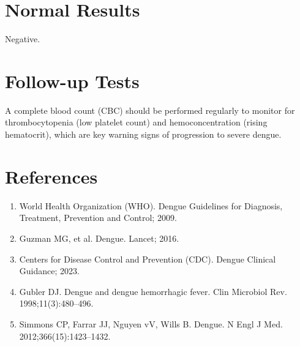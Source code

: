 \section*{Normal Results}
Negative.

\section*{Follow-up Tests}
A complete blood count (CBC) should be performed regularly to monitor for thrombocytopenia (low platelet count) and hemoconcentration (rising hematocrit), which are key warning signs of progression to severe dengue.

\section*{References}
\begin{enumerate}
  \item World Health Organization (WHO). Dengue Guidelines for Diagnosis, Treatment, Prevention and Control; 2009.
  \item Guzman MG, et al. Dengue. Lancet; 2016.
  \item Centers for Disease Control and Prevention (CDC). Dengue Clinical Guidance; 2023.
  \item Gubler DJ. Dengue and dengue hemorrhagic fever. Clin Microbiol Rev. 1998;11(3):480--496.
  \item Simmons CP, Farrar JJ, Nguyen vV, Wills B. Dengue. N Engl J Med. 2012;366(15):1423--1432.
\end{enumerate}

\clearpage
